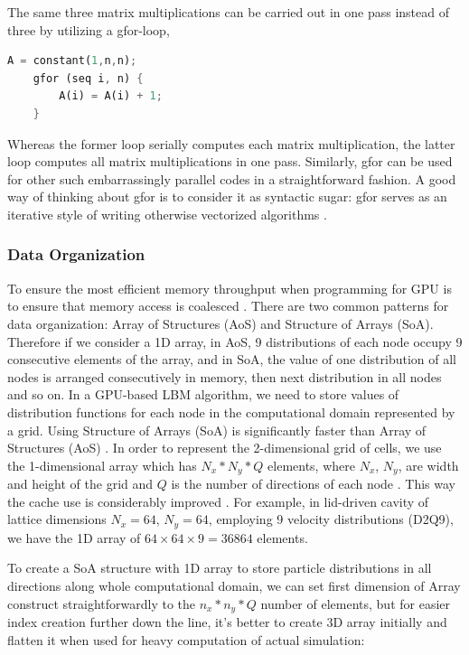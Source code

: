 The same three matrix multiplications can be carried out in one pass instead of three by utilizing a gfor-loop,

\begin{lstlisting}[language=Rust, caption=Pseudo-code with if-statement removed]
	A = constant(1,n,n);
	gfor (seq i, n) {
		A(i) = A(i) + 1;
	}
\end{lstlisting}

Whereas the former loop serially computes each matrix multiplication, the latter loop computes all matrix multiplications in one pass. Similarly, gfor can be used for other such embarrassingly parallel codes in a straightforward fashion. A good way of thinking about gfor is to consider it as syntactic sugar: gfor serves as an iterative style of writing otherwise vectorized algorithms \citep{malcolmArrayFireGPUAcceleration2012a}.

\subsubsection{Data Organization}
To ensure the most efficient memory throughput when programming for GPU is to ensure that memory access is coalesced \cite{tranPerformanceOptimization3D2017}. There are two common patterns for data organization: Array of Structures (AoS) and Structure of Arrays (SoA). Therefore if we consider a 1D array, in AoS, 9 distributions of each node occupy 9 consecutive elements of the array, and in SoA, the value of one distribution of all nodes is arranged consecutively in memory, then next distribution in all nodes and so on. In a GPU-based LBM algorithm, we need to store values of distribution functions for each node in the computational domain represented by a grid. Using Structure of Arrays (SoA) is significantly faster than Array of Structures (AoS) \cite{tranPerformanceOptimization3D2017, delboscOptimizedImplementationLattice2014}. In order to represent the 2-dimensional grid of cells, we use the 1-dimensional array which has $N_x*N_y*Q$ elements, where $N_x$, $N_y$, are width and height of the grid and $Q$ is the number of directions of each node \cite{tranPerformanceOptimization3D2017}. This way the cache use is considerably improved \cite{Mawson2014InteractiveFI}. For example, in lid-driven cavity of lattice dimensions $N_x=64$, $N_y=64$, employing 9 velocity distributions (D2Q9), we have the 1D array of $64\times64\times9 = 36864$ elements.

To create a SoA structure with 1D array to store particle distributions in all directions along whole computational domain, we can set first dimension of Array construct straightforwardly to the $n_x*n_y*Q$ number of elements, but for easier index creation further down the line, it's better to create 3D array initially and flatten it when used for heavy computation of actual simulation:

